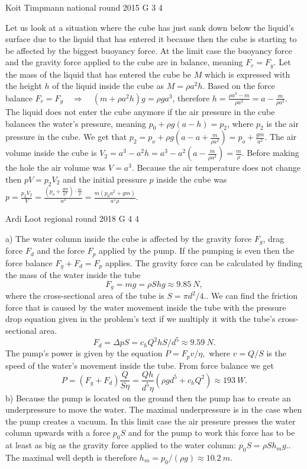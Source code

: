\documentclass[11pt]{article}
\begin{document}
{Koit Timpmann} %
{national round} %
{2015} %
{G 3} %
{4} %
{

\ifEngSolution
Let us look at a situation where the cube has just sank down below the liquid’s surface due to the liquid that has entered it because then the cube is starting to be affected by the biggest buoyancy force. At the limit case the buoyancy force and the gravity force applied to the cube are in balance, meaning $F_r = F_y$. Let the mass of the liquid that has entered the cube be $M$ which is expressed with the height $h$ of the liquid inside the cube as $M = \rho a^2h$. Based on the force balance $F_r = F_y \quad\Rightarrow\quad (m + \rho a^2h)g=\rho ga^3$, therefore $h = \frac{\rho a^3 - m}{\rho a^2} = a - \frac{m}{\rho a^2}$. The liquid does not enter the cube anymore if the air pressure in the cube balances the water’s pressure, meaning $p_0 + \rho g(a-h) = p_2$, where $p_2$ is the air pressure in the cube. We get that $p_2 = p_o + \rho g\left(a - a + \frac{m}{\rho a^2}\right) = p_o +  \frac{gm}{a^2}$. The air volume inside the cube is $V_2 = a^3 - a^2h = a^3 - a^2\left(a - \frac{m}{\rho a^2}\right) = \frac{m}{\rho}$. Before making the hole the air volume was $V=a^3$. Because the air temperature does not change then $pV = p_2V_2$ and the initial pressure $p$ inside the cube was $p = \frac{p_2V_2}{V} = \frac{ \left( p_o +  \frac{gm}{a^2} \right) \cdot \frac{m}{\rho}}{a^3} = \frac{m(p_0a^2 + gm)}{a^5\rho}$.
\fi
}

{Ardi Loot} %
{regional round} %
{2018} %
{G 4} %
{4} %
{

\ifEngSolution
a) The water column inside the cube is affected by the gravity force $F_{g}$, drag force $F_{d}$ and the force $F_{p}$ applied by the pump. If the pumping is even then the force balance $F_{g}+F_{d}=F_{p}$ applies. The gravity force can be calculated by finding the mass of the water inside the tube
\[
F_{g}=mg=\rho Shg\approx\SI{9.85}{N},
\]
where the cross-sectional area of the tube is $S=\pi d^{2}/4.$. We can find the friction force that is caused by the water movement inside the tube with the pressure drop equation given in the problem’s text if we multiply it with the tube’s cross-sectional area. 
\[
F_{d}=\Delta pS=c_{h}Q^{2}hS/d^{5}\approx\SI{9.59}{N}.
\]
The pump’s power is given by the equation $P=F_{p}v/\eta,$ where $v=Q/S$ is the speed of the water’s movement inside the tube. From force balance we get
\[
P=\left(F_{g}+F_{d}\right)\frac{Q}{S\eta}=\frac{Qh}{d^{5}\eta}\left(\rho gd^{5}+c_{h}Q^{2}\right)\approx\SI{193}{W}.
\]
b) Because the pump is located on the ground then the pump has to create an underpressure to move the water. The maximal underpressure is in the case when the pump creates a vacuum. In this limit case the air pressure presses the water column upwards with a force $p_{0}S$ and for the pump to work this force has to be at least as big as the gravity force applied to the water column: $p_{0}S=\rho Sh_{m}g.$. The maximal well depth is therefore $h_{m}=p_{0}/\left(\rho g\right)\approx\SI{10.2}{m}$.
\fi
}
\end{document}
